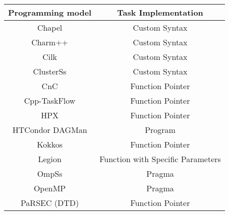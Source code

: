 \begin{tabular}{cc}
\hline
Programming model & Task Implementation \\
\hline
Chapel & Custom Syntax\\
Charm++ & Custom Syntax\\
Cilk & Custom Syntax\\
ClusterSs & Custom Syntax\\
CnC & Function Pointer\\
Cpp-TaskFlow & Function Pointer\\
HPX & Function Pointer\\
HTCondor DAGMan & Program\\
Kokkos & Function Pointer\\
Legion & Function with Specific Parameters\\
OmpSs & Pragma\\
OpenMP & Pragma\\
PaRSEC (DTD) & Function Pointer\\
\hline
\end{tabular}
